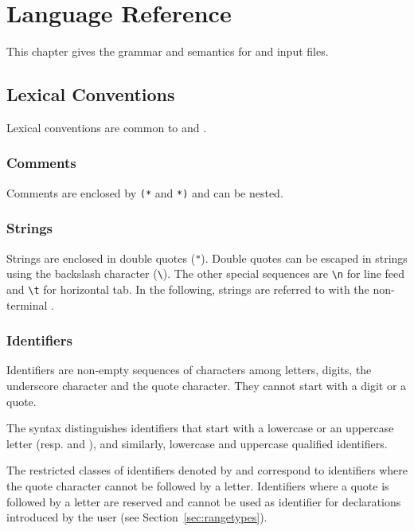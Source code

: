 \chapter{Language Reference}
\label{chap:syntaxref}

This chapter gives the grammar and semantics for \why and \whyml input files.

\section{Lexical Conventions}

Lexical conventions are common to \why and \whyml.


\subsection{Comments}

Comments are enclosed by \texttt{(*} and \texttt{*)} and can be nested.

\subsection{Strings}

Strings are enclosed in double quotes (\verb!"!). Double quotes can be
escaped in strings using the backslash character (\verb!\!).
The other special sequences are \verb!\n! for line feed and \verb!\t!
for horizontal tab.
In the following, strings are referred to with the non-terminal
.

\subsection{Identifiers}

Identifiers are non-empty sequences of characters among letters,
digits, the underscore character and the quote character. They cannot
start with a digit or a quote.

\begin{center}\framebox{}\end{center}

The syntax distinguishes identifiers that start with a lowercase or an
uppercase letter (resp.  and ), and
similarly, lowercase and uppercase qualified identifiers.

The restricted classes of identifiers denoted by 
and  correspond to identifiers where the quote
character cannot be followed by a letter. Identifiers where a quote is
followed by a letter are reserved and cannot be used as identifier for
declarations introduced by the user (see Section~\ref{sec:rangetypes}).


